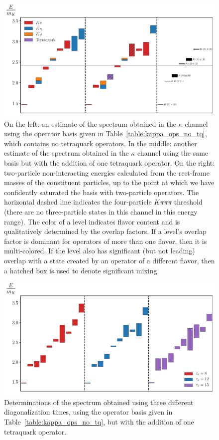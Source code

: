 \begin{figure}
  \centering
  \hspace*{-0.5in}\includegraphics[width=\textwidth]{figures/spectrum_a1g/staircase.pdf}
  \caption[A comparison of spectrum determinations made in the $\kappa$ channel.]{On the left: an estimate of the spectrum obtained in the $\kappa$ channel using the operator basis given in Table~\ref{table:kappa_ops_no_tq}, which contains no tetraquark operators. In the middle: another estimate of the spectrum obtained in the $\kappa$ channel using the same basis but with the addition of one tetraquark operator. On the right: two-particle non-interacting energies calculated from the rest-frame masses of the constituent particles, up to the point at which we have confidently saturated the basis with two-particle operators. The horizontal dashed line indicates the four-particle $K\pi\pi\pi$ threshold (there are no three-particle states in this channel in this energy range). The color of a level indicates flavor content and is qualitatively determined by the overlap factors. If a level's overlap factor is dominant for operators of more than one flavor, then it is multi-colored. If the level also has significant (but not leading) overlap with a state created by an operator of a different flavor, then a hatched box is used to denote significant mixing.}
  \label{fig:kappa_spectrum}
\end{figure}

\begin{figure}
  \centering
  \hspace*{-0.5in}\includegraphics[width=\textwidth]{figures/spectrum_a1g/staircase_tau_d.pdf}
  \caption{Determinations of the spectrum obtained using three different diagonalization times, using the operator basis given in Table~\ref{table:kappa_ops_no_tq}, but with the addition of one tetraquark operator.}
  \label{fig:spectrum_td}
\end{figure}

